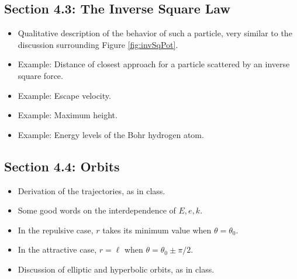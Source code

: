 \documentclass[../notes.tex]{subfiles}
\begin{document}
\subsection*{Section 4.3: The Inverse Square Law}
\begin{itemize}
    \item Qualitative description of the behavior of such a particle, very similar to the discussion surrounding Figure \ref{fig:invSqPot}.
    \item Example: Distance of closest approach for a particle scattered by an inverse square force.
    \item Example: Escape velocity.
    \item Example: Maximum height.
    \item Example: Energy levels of the Bohr hydrogen atom.
\end{itemize}


\subsection*{Section 4.4: Orbits}
\begin{itemize}
    \item Derivation of the trajectories, as in class.
    \item Some good words on the interdependence of $E,e,k$.
    \item In the repulsive case, $r$ takes its minimum value when $\theta=\theta_0$.
    \item In the attractive case, $r=\ell$ when $\theta=\theta_0\pm\pi/2$.
    \item Discussion of elliptic and hyperbolic orbits, as in class.
\end{itemize}
\end{document}
